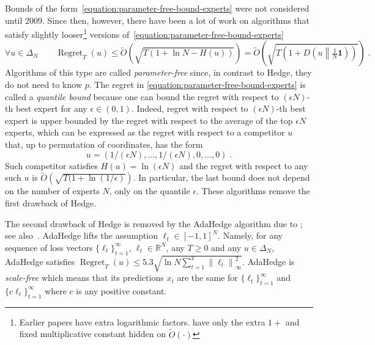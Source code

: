 \documentclass{colt2016} %
\DeclareMathOperator{\Regret}{Regret}
\newcommand{\R}{\mathbb{R}}     %
\newcommand{\KL}[2]{D\left({#1}\middle\|{#2}\right)}  %
\newcommand{\norm}[1]{\left\|{#1}\right\|}
\newcommand{\indicator}{\mathbf{1}}
\begin{document}
Bounds of the form~\eqref{equation:parameter-free-bound-experts} were not
considered until 2009. Since then, however, there have been a lot of work
\citep{Chaudhuri-Freund-Hsu-2009, Chernov-Vovk-2010, Koolen-van-Erven-2015,
Luo-Schapire-2014, Luo-Schapire-2015, Foster-Rakhlin-Sridharan-2015,
Orabona-Pal-2016-parameter-free} on algorithms that satisfy slightly
looser\footnote{Earlier papers have extra logarithmic factors.
\citet{Foster-Rakhlin-Sridharan-2015, Orabona-Pal-2016-parameter-free} have
only the extra $1+$ and fixed multiplicative constant hidden on $\widetilde
O(\cdot)$} versions of~\eqref{equation:parameter-free-bound-experts}
\begin{equation}
\label{equation:parameter-free-bound-experts-2}
\forall u \in \Delta_N \qquad \Regret_T(u) \le \widetilde O(\sqrt{T (1 + \ln N - H(u))}) = \widetilde O\left(\sqrt{T \left(1 + \KL{u}{\tfrac{1}{N}\indicator} \right)} \right) \; .
\end{equation}
Algorithms of this type are called \emph{parameter-free} since, in contrast to
Hedge, they do not need to know $p$. The regret in
\eqref{equation:parameter-free-bound-experts} is called a \emph{quantile bound}
because one can bound the regret with respect to $(\epsilon N)$-th best expert
for any $\epsilon \in (0,1)$. Indeed, regret with respect to $(\epsilon N)$-th
best expert is upper bounded by the regret with respect to the average of the
top $\epsilon N$ experts, which can be expressed as the regret with respect to
a competitor $u$ that, up to permutation of coordinates, has the form
$$
u = \left( 1/(\epsilon N), \dots, 1/(\epsilon N), 0, \dots, 0 \right) \; .
$$
Such competitor satisfies $H(u) = \ln (\epsilon N)$ and the regret with respect
to any such $u$ is $\widetilde O(\sqrt{T (1 + \ln(1/\epsilon)})$. In
particular, the last bound does not depend on the number of experts $N$, only
on the quantile $\epsilon$.  These algorithms remove the first drawback of
Hedge.

The second drawback of Hedge is removed by the AdaHedge algorithm due to
\cite{de-Rooij-van-Erven-Grunwald-Koolen-2014}; see
also~\citep{Orabona-Pal-2016-parameter-free}. AdaHedge lifts the assumption
$\ell_t \in [-1,1]^N$. Namely, for any sequence of loss vectors
$\{\ell_t\}_{t=1}^\infty$, $\ell_t \in \R^N$, any $T \ge 0$ and any $u \in
\Delta_N$, AdaHedge satisfies $\Regret_T(u) \le 5.3 \sqrt{\ln N \sum_{t=1}^T
\norm{\ell_t}_\infty^2}$. AdaHedge is \emph{scale-free} which means that its
predictions $x_t$ are the same for $\{\ell_t\}_{t=1}^\infty$ and $\{c
\ell_t\}_{t=1}^\infty$ where $c$ is any positive constant.
\end{document}
